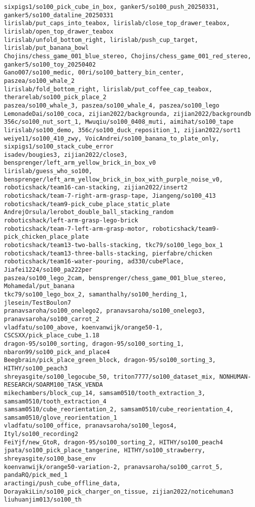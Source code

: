 \begin{verbatim}
sixpigs1/so100_pick_cube_in_box, ganker5/so100_push_20250331, ganker5/so100_dataline_20250331
lirislab/put_caps_into_teabox, lirislab/close_top_drawer_teabox, lirislab/open_top_drawer_teabox
lirislab/unfold_bottom_right, lirislab/push_cup_target, lirislab/put_banana_bowl
Chojins/chess_game_001_blue_stereo, Chojins/chess_game_001_red_stereo, ganker5/so100_toy_20250402
Gano007/so100_medic, 00ri/so100_battery_bin_center, paszea/so100_whale_2
lirislab/fold_bottom_right, lirislab/put_coffee_cap_teabox, therarelab/so100_pick_place_2
paszea/so100_whale_3, paszea/so100_whale_4, paszea/so100_lego
LemonadeDai/so100_coca, zijian2022/backgrounda, zijian2022/backgroundb
356c/so100_nut_sort_1, Mwuqiu/so100_0408_muti, aimihat/so100_tape
lirislab/so100_demo, 356c/so100_duck_reposition_1, zijian2022/sort1
weiye11/so100_410_zwy, VoicAndrei/so100_banana_to_plate_only, sixpigs1/so100_stack_cube_error
isadev/bougies3, zijian2022/close3, bensprenger/left_arm_yellow_brick_in_box_v0
lirislab/guess_who_so100, bensprenger/left_arm_yellow_brick_in_box_with_purple_noise_v0, 
roboticshack/team16-can-stacking, zijian2022/insert2
roboticshack/team-7-right-arm-grasp-tape, Jiangeng/so100_413
roboticshack/team9-pick_cube_place_static_plate
AndrejOrsula/lerobot_double_ball_stacking_random 
roboticshack/left-arm-grasp-lego-brick
roboticshack/team-7-left-arm-grasp-motor, roboticshack/team9-pick_chicken_place_plate
roboticshack/team13-two-balls-stacking, tkc79/so100_lego_box_1
roboticshack/team13-three-balls-stacking, pierfabre/chicken
roboticshack/team16-water-pouring, ad330/cubePlace, Jiafei1224/so100_pa222per
paszea/so100_lego_2cam, bensprenger/chess_game_001_blue_stereo, Mohamedal/put_banana
tkc79/so100_lego_box_2, samanthalhy/so100_herding_1, jlesein/TestBoulon7
pranavsaroha/so100_onelego2, pranavsaroha/so100_onelego3, pranavsaroha/so100_carrot_2
vladfatu/so100_above, koenvanwijk/orange50-1, CSCSXX/pick_place_cube_1.18
dragon-95/so100_sorting, dragon-95/so100_sorting_1, nbaron99/so100_pick_and_place4
Beegbrain/pick_place_green_block, dragon-95/so100_sorting_3, HITHY/so100_peach3
shreyasgite/so100_legocube_50, triton7777/so100_dataset_mix, NONHUMAN-RESEARCH/SOARM100_TASK_VENDA
mikechambers/block_cup_14, samsam0510/tooth_extraction_3, samsam0510/tooth_extraction_4
samsam0510/cube_reorientation_2, samsam0510/cube_reorientation_4, samsam0510/glove_reorientation_1
vladfatu/so100_office, pranavsaroha/so100_legos4, Ityl/so100_recording2
FeiYjf/new_GtoR, dragon-95/so100_sorting_2, HITHY/so100_peach4
jpata/so100_pick_place_tangerine, HITHY/so100_strawberry, shreyasgite/so100_base_env
koenvanwijk/orange50-variation-2, pranavsaroha/so100_carrot_5, pandaRQ/pick_med_1
aractingi/push_cube_offline_data, DorayakiLin/so100_pick_charger_on_tissue, zijian2022/noticehuman3
liuhuanjim013/so100_th
\end{verbatim}